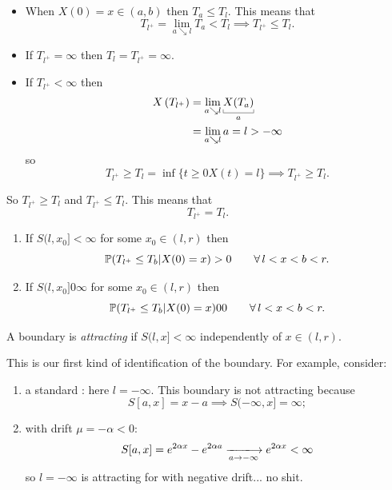 \documentclass[12pt]{report}
\begin{document}
\begin{fancyproof}
	\begin{itemize}
		\item When $X(0)=x\in(a,b)$ then $T_{a}\leq T_{l}$. This means that 
		\begin{equation*}
		T_{l^{+}}=\lim_{a\searrow l}T_{a}<T_{l}\implies T_{l^{+}}\leq T_{l}.
		\end{equation*}
		\item If $T_{l^{+}}=\infty$ then $T_{l}=T_{l^{+}}=\infty$.
		\item If $T_{l^{+}}<\infty$ then 
		\begin{align*}
			X\left(T_{l^{+}}\right)&=\lim_{a\searrow l}\ubracketthin{X(T_{a})}_{a}\\
			&=\lim_{a\searrow l} a=l>-\infty
		\end{align*}
		so
		\begin{equation*}
			T_{l^{+}}\geq T_{l}=\inf\{t\geq0 X(t)=l\}\implies T_{l^{+}}\geq T_{l}.
		\end{equation*}
	\end{itemize}
	So $T_{l^{+}}\geq T_{l}$ and $T_{l^{+}}\leq T_{l}$. This means that \begin{equation*}
		T_{l^{+}}=T_{l}.
	\end{equation*}
\end{fancyproof}
\begin{lemma}
	\begin{enumerate}
		\item If $S(l,x_{0}]<\infty$ for some $x_{0}\in(l,r)$ then
		\begin{equation*}
			\mathbb{P}(T_{l^{+}}\leq T_{b}|X(0)=x)>0\qquad\forall\, l<x<b<r.
		\end{equation*}
		\item If $S(l,x_{0}]0\infty$ for some $x_{0}\in(l,r)$ then
		\begin{equation*}
			\mathbb{P}(T_{l^{+}}\leq T_{b}|X(0)=x)00\qquad\forall\, l<x<b<r.
		\end{equation*}
	\end{enumerate}
\end{lemma}
\begin{definition}
	A boundary is \emph{attracting} if $S(l,x]<\infty$ independently of $x\in(l,r)$.
\end{definition}
This is our first kind of identification of the boundary. For example, consider:
\begin{enumerate}
	\item a standard \bwm: here $l=-\infty$. This boundary is not attracting because
	\begin{equation*}
		S[a,x]=x-a\implies S(-\infty,x]=\infty;
	\end{equation*}
	\item \bwm{} with drift $\mu=-\alpha<0$:
	\begin{equation*}
		S[a,x]=e^{2\alpha x}-e^{2\alpha a}\xlongrightarrow[a\to-\infty]{}e^{2\alpha x}<\infty
	\end{equation*} 
	so $l=-\infty$ is attracting for \bwm{} with negative drift... no shit.
\end{enumerate}
\end{document}
